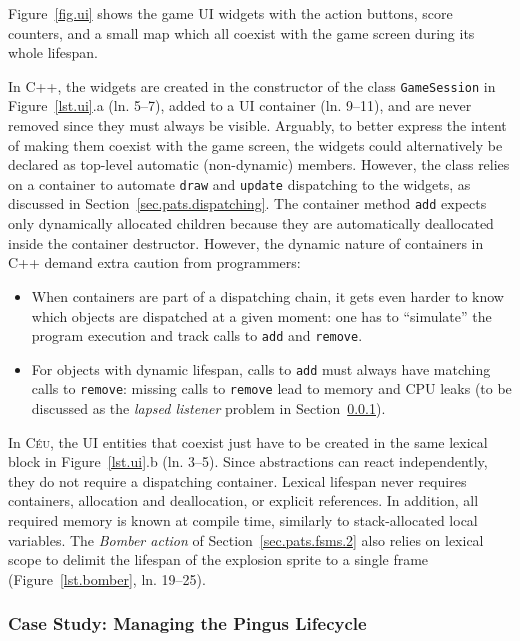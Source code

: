 \documentclass{vgtc}                          %
\newcommand{\CEU}{\textsc{C\'{e}u}\xspace}
\newcommand{\code}[1] {{\small{\texttt{#1}}}}
\begin{document}
Figure~\ref{fig.ui} shows the game UI widgets with the action buttons, score
counters, and a small map which all coexist with the game screen during its
whole lifespan.

In C++, the widgets are created in the constructor of the class
\code{GameSession} in Figure~\ref{lst.ui}.a (ln. 5--7), added to a UI container
(ln. 9--11), and are never removed since they must always be visible.
Arguably, to better express the intent of making them coexist with the game
screen, the widgets could alternatively be declared as top-level automatic
(non-dynamic) members.
However, the class relies on a container to automate \code{draw} and
\code{update} dispatching to the widgets, as discussed in
Section~\ref{sec.pats.dispatching}.
The container method \code{add} expects only dynamically allocated children
because they are automatically deallocated inside the container destructor.
%
However, the dynamic nature of containers in C++ demand extra caution from
programmers:
%
\begin{itemize}
\item When containers are part of a dispatching chain, it gets even harder to
      know which objects are dispatched at a given moment:
      one has to ``simulate'' the program execution and track calls to
      \code{add} and \code{remove}.
\item For objects with dynamic lifespan, calls to \code{add} must always have
      matching calls to \code{remove}:
      missing calls to \code{remove} lead to memory and CPU leaks (to be
      discussed as the \emph{lapsed listener} problem in
      Section~\ref{sec.pats.lifespan.2}).
\end{itemize}

In \CEU, the UI entities that coexist just have to be created in the same
lexical block in Figure~\ref{lst.ui}.b (ln. 3--5).
%
Since abstractions can react independently, they do not require a dispatching
container.
%
Lexical lifespan never requires containers, allocation and deallocation, or
explicit references.
In addition, all required memory is known at compile time, similarly to
stack-allocated local variables.
%
The \emph{Bomber action} of Section~\ref{sec.pats.fsms.2} also relies on
lexical scope to delimit the lifespan of the explosion sprite to a single
frame (Figure~\ref{lst.bomber}, ln. 19--25).

\subsubsection{Case Study: Managing the Pingus Lifecycle}
\label{sec.pats.lifespan.2}
\end{document}
